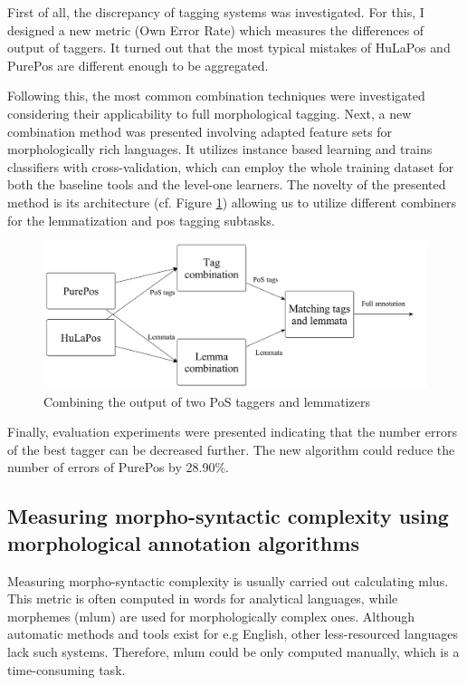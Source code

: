 First of all, the discrepancy of tagging systems was investigated. 
For this, I designed a new metric (Own Error Rate) which measures the differences of output of taggers.
It turned out that the most typical mistakes of HuLaPos \cite{Laki2013} and PurePos are different enough to be aggregated.

Following this, the most common combination techniques were investigated considering their applicability to full morphological tagging.
Next, a new combination method was presented involving adapted feature sets for morphologically rich languages.
It utilizes instance based learning \cite{Aha1991} and trains classifiers with cross-validation, which
can employ the whole training dataset for both the baseline tools and the level-one learners. %
The novelty of the presented method is its architecture (cf. Figure \ref{fig:comb3_en}) allowing us to utilize different combiners for the lemmatization and \acrshort{pos} tagging subtasks.

\begin{figure}[H]
  \centering
  \includegraphics[scale=0.15]{MorphTagging/comb3.png} 
  \caption{Combining the output of two PoS taggers and lemmatizers}
  \label{fig:comb3_en}
\end{figure}

Finally, evaluation experiments were presented indicating that the number errors of the best tagger can be decreased further.
The new algorithm could reduce the number of errors of PurePos by 28.90\%.

\subsection{Measuring morpho-syntactic complexity using morphological annotation algorithms}
\label{thes:mlu}


Measuring morpho-syntactic complexity is usually carried out calculating \acrlong{mlu}s.
This metric is often computed in words for analytical languages, while morphemes (\acrshort{mlum}) are used for morphologically complex ones.
Although automatic methods and tools exist for e.g English, other less-resourced languages lack such systems.
Therefore, \acrshort{mlum} could be only computed manually, which is a time-consuming task.

